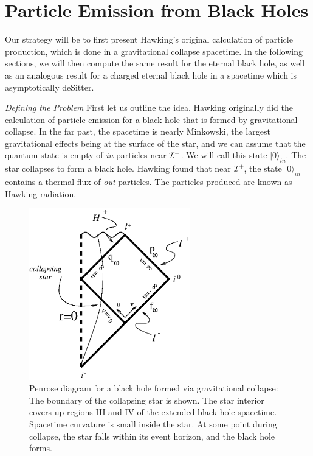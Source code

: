 \documentclass[12pt]{article}
\newcommand{\sectiono}[1]{\section{#1}\setcounter{equation}{0}}
\def\finf{{\cal I}^+}
\def\pinf{{\cal I}^-}
\def\vac{|0\rangle_{in} }
\begin{document}
\sectiono{Particle Emission from Black Holes}

Our strategy will be to first present Hawking's original calculation of
particle production,
which is done in a gravitational collapse spacetime.  In the following
sections, we will then
compute the same result for the eternal black hole, as well as an analogous
result for a
charged eternal black hole in a  spacetime which is asymptotically deSitter.

\vskip 0.1in\noindent
{\it Defining the Problem}
\vskip 0.05in
First let us outline the idea.
Hawking \cite{hawking}  originally did the calculation of particle emission
for a black hole that is formed by gravitational collapse. In
the far past, the spacetime is nearly Minkowski, the largest gravitational
effects being at the surface of the star, and we can assume that the
quantum state is empty of {\it in}-particles near $\pinf$\!.
We will call this state $\vac$.
The star collapses to form a black hole.  Hawking found that near $\finf\!$,
the state $\vac$
contains a thermal flux of {\it out}-particles. The particles produced are
known as Hawking
radiation.
%
\begin{figure}[tb]
\begin{center}
\includegraphics[width=2.75in]{collapse.eps}
\end{center}
\caption{Penrose diagram for a black hole formed via gravitational
collapse: The boundary of
the collapsing star is shown. The star interior covers up
regions III and IV of the extended black hole spacetime. Spacetime
curvature is small inside the star.
At some point during collapse, the star falls within its event horizon,
and the black hole forms.}
\label{f4}
\end{figure}
%
%
\end{document}
